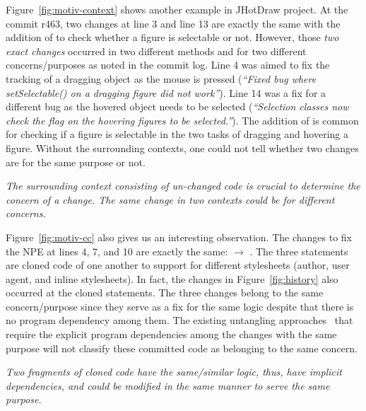 Figure~\ref{fig:motiv-context} shows another example in JHotDraw
project. At the commit r463, two changes at line 3 and line 13 are
exactly the same with the addition of  to
check whether a figure is selectable or not. However, those {\em two
  exact changes} occurred in two different methods 
and  for two different concerns/purposes as
noted in the commit log. Line 4 was aimed to fix the tracking of a
dragging object as the mouse is pressed ({\em ``Fixed bug where
  setSelectable() on a dragging figure did not work''}).  Line 14 was
a fix for a different bug as the hovered object needs to be selected
({\em ``Selection classes now check the flag on the hovering figures
  to be selected.''}). The addition of  is
common for checking if a figure is selectable in the two tasks of
dragging and hovering a figure. Without the surrounding contexts,
one could not tell whether two changes are for the same purpose or not.

\vspace{3pt}
 {\em The surrounding context
  consisting of un-changed code is crucial to determine the
  concern of a change. The same change in two 
  contexts could be for different concerns}.

\vspace{3pt}
Figure~\ref{fig:motiv-cc} also gives us an interesting
observation. The changes to fix the NPE at lines 4, 7, and 10 are
exactly the same:  $\rightarrow$
.  The three statements are cloned code
of one another to support for different stylesheets (author, user
agent, and inline stylesheets).  In fact, the changes in
Figure~\ref{fig:history} also occurred at the cloned statements. The
three changes belong to the same concern/purpose since they serve as a
fix for the same logic despite that there is no program dependency
among them. The existing untangling
approaches~\cite{flexeme-fse20,smartcommit-fse21,roover-scam18,barnett-icse15}
that require the explicit program dependencies among the changes with
the same purpose will not classify these committed code as belonging
to the same concern.


\vspace{2pt}
 {\em Two
  fragments of cloned code have the same/similar logic, thus, have
  implicit dependencies, and could be modified in the same manner to
  serve the same purpose.}




